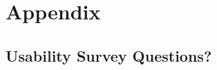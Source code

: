 \documentclass[12pt, titlepage]{article}
\begin{document}

		


					
					
					
					
					

					
					
					
					





				

\newpage

\section{Appendix}

\subsection{Usability Survey Questions?}
\end{document}
